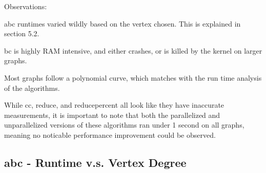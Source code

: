 \documentclass[12pt]{article}
\begin{document}
Observations:

abc runtimes varied wildly based on the vertex chosen. This is explained in section 5.2.

bc is highly RAM intensive, and either crashes, or is killed by the kernel on larger graphs. 

Most graphs follow a polynomial curve, which matches with the run time analysis of the algorithms.

While cc, reduce, and reducepercent all look like they have inaccurate measurements, it is important to note that both the parallelized and unparallelized versions of these algorithms ran under 1 second on all graphs, meaning no noticable performance improvement could be observed.


\subsection{abc - Runtime v.s. Vertex Degree }
\end{document}
